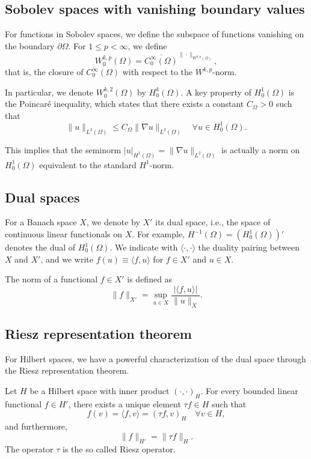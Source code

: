 \subsection{Sobolev spaces with vanishing boundary values}

For functions in Sobolev spaces, we define the subspace of functions vanishing on the boundary $\partial\Omega$. For $1 \leq p < \infty$, we define
\[
W_0^{k,p}(\Omega) = \overline{C_0^\infty(\Omega)}^{\|\cdot\|_{W^{k,p}(\Omega)}},
\]
that is, the closure of $C_0^\infty(\Omega)$ with respect to the $W^{k,p}$-norm.

In particular, we denote $W_0^{k,2}(\Omega)$ by $H_0^k(\Omega)$. A key property of $H_0^1(\Omega)$ is the Poincaré inequality, which states that there exists a constant $C_{\Omega} > 0$ such that
\[
\|u\|_{L^2(\Omega)} \leq C_{\Omega} \|\nabla u\|_{L^2(\Omega)} \quad \forall u \in H_0^1(\Omega).
\]

This implies that the seminorm $|u|_{H^1(\Omega)} = \|\nabla u\|_{L^2(\Omega)}$ is actually a norm on $H_0^1(\Omega)$ equivalent to the standard $H^1$-norm.

\subsection{Dual spaces}

For a Banach space $X$, we denote by $X'$ its dual space, i.e., the space of continuous linear functionals on $X$. For example, $H^{-1}(\Omega) = (H_0^1(\Omega))'$ denotes the dual of $H_0^1(\Omega)$. We indicate with $\langle \cdot, \cdot \rangle$ the duality pairing between $X$ and $X'$, and we write $f(u) \equiv \langle f, u \rangle$ for $f \in X'$ and $u \in X$.

The norm of a functional $f \in X'$ is defined as
\[
\|f\|_{X'} = \sup_{u \in X} \frac{|\langle f, u \rangle|}{\|u\|_X}.
\]

\subsection{Riesz representation theorem}

For Hilbert spaces, we have a powerful characterization of the dual space through the Riesz representation theorem.

\begin{theorem}
  \label{theo:riesz_representation}
Let $H$ be a Hilbert space with inner product $(\cdot, \cdot)_H$. For every bounded linear functional $f \in H'$, there exists a unique element $\tau f \in H$ such that
\[
f(v) = \langle f, v \rangle = (\tau f, v)_H \quad \forall v \in H,
\]
and furthermore,
\[
\|f\|_{H'} = \|\tau f\|_H.
\]
The operator $\tau$ is the so called Riesz operator.
\end{theorem}


